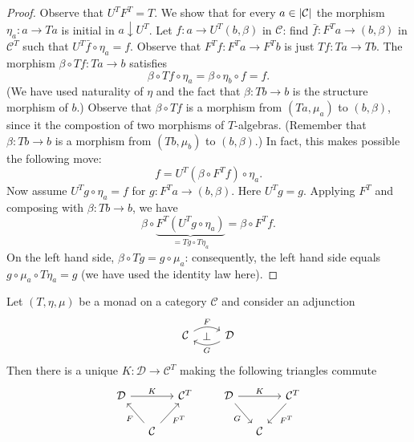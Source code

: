 \begin{proof}
  Observe that \(U^T F^T = T\). We show that for every
  \(a \in \left\lvert\mathcal{C}\right\rvert\) the morphism \(\eta_a : a \to Ta\) is initial in
  \(a \downarrow U^T\). Let \(f : a \to U^T(b, \beta)\) in
  \(\mathcal{C}\): find \(\bar f : F^Ta \to (b, \beta)\) in
  \(\mathcal{C}^T\) such that \(U^T\bar f \circ \eta_a = f\). Observe that
  \(F^T f : F^Ta \to F^Tb\) is just \(Tf : Ta \to Tb\). The morphism
  \(\beta \circ Tf : Ta \to b\) satisfies
  \[
    \beta \circ Tf \circ \eta_a = \beta \circ \eta_b \circ f = f .
  \]
  (We have used naturality of \(\eta\) and the fact that
  \(\beta : Tb \to b\) is the structure morphism of \(b\).) Observe that
  \(\beta \circ Tf\) is a morphism from \((Ta, \mu_a)\) to
  \((b, \beta)\), since it the compostion of two morphisms of
  \(T\)-algebras. (Remember that \(\beta : Tb \to b\) is a morphism from
  \((Tb, \mu_b)\) to \((b, \beta)\).) In fact, this makes possible the
  following move:
  \[
    f = U^T\left( \beta \circ F^Tf \right) \circ \eta_a .
  \]
  Now assume \(U^Tg \circ \eta_a = f\) for \(g : F^Ta \to (b, \beta)\). Here
  \(U^Tg = g\). Applying \(F^T\) and composing with
  \(\beta : Tb \to b\), we have
  \[
    \beta \circ \underbrace{F^T \left( U^Tg \circ \eta_a \right)}_{= Tg \circ T\eta_a} = \beta \circ
    F^Tf .
  \]
  On the left hand side, \(\beta \circ Tg = g \circ \mu_a\): consequently, the left
  hand side equals \(g \circ \mu_a \circ T\eta_a = g\) (we have used the identity law
  here).
\end{proof}

\begin{proposition}\label{proposition:ComparisonFunctor}
  Let \((T, \eta, \mu)\) be a monad on a category \(\mathcal{C}\) and consider an
  adjunction
  \[
    \begin{tikzcd}
      \mathcal{C} \ar["{F}"{name=left}, r, bend left] & \mathcal{D} \ar["{G}"{name=right},
      l, bend left] \ar["{\perp}"description, phantom, from=left, to=right]
    \end{tikzcd}
  \]
  Then there is a unique \(K : \mathcal{D} \to \mathcal{C}^T\) making the following triangles
  commute
  \[
    \begin{tikzcd}[column sep=small]
      \mathcal{D} \ar["{K}", rr] & & \mathcal{C}^T \\
      & \mathcal{C} \ar["{F}", ul] \ar["{F^T}", ur, swap]
    \end{tikzcd}
    \qquad
    \begin{tikzcd}[column sep=small]
      \mathcal{D} \ar["{G}", dr, swap] \ar["{K}", rr] & & \mathcal{C}^T \ar["{F^T}", dl] \\
      & \mathcal{C}
    \end{tikzcd}
  \]
\end{proposition}

